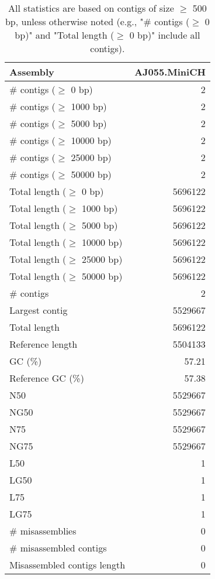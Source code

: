 \documentclass[12pt,a4paper]{article}
\begin{document}
\begin{table}[ht]
\begin{center}
\caption{All statistics are based on contigs of size $\geq$ 500 bp, unless otherwise noted (e.g., "\# contigs ($\geq$ 0 bp)" and "Total length ($\geq$ 0 bp)" include all contigs).}
\begin{tabular}{|l*{1}{|r}|}
\hline
Assembly & AJ055.MiniCH \\ \hline
\# contigs ($\geq$ 0 bp) & 2 \\ \hline
\# contigs ($\geq$ 1000 bp) & 2 \\ \hline
\# contigs ($\geq$ 5000 bp) & 2 \\ \hline
\# contigs ($\geq$ 10000 bp) & 2 \\ \hline
\# contigs ($\geq$ 25000 bp) & 2 \\ \hline
\# contigs ($\geq$ 50000 bp) & 2 \\ \hline
Total length ($\geq$ 0 bp) & 5696122 \\ \hline
Total length ($\geq$ 1000 bp) & 5696122 \\ \hline
Total length ($\geq$ 5000 bp) & 5696122 \\ \hline
Total length ($\geq$ 10000 bp) & 5696122 \\ \hline
Total length ($\geq$ 25000 bp) & 5696122 \\ \hline
Total length ($\geq$ 50000 bp) & 5696122 \\ \hline
\# contigs & 2 \\ \hline
Largest contig & 5529667 \\ \hline
Total length & 5696122 \\ \hline
Reference length & 5504133 \\ \hline
GC (\%) & 57.21 \\ \hline
Reference GC (\%) & 57.38 \\ \hline
N50 & 5529667 \\ \hline
NG50 & 5529667 \\ \hline
N75 & 5529667 \\ \hline
NG75 & 5529667 \\ \hline
L50 & 1 \\ \hline
LG50 & 1 \\ \hline
L75 & 1 \\ \hline
LG75 & 1 \\ \hline
\# misassemblies & 0 \\ \hline
\# misassembled contigs & 0 \\ \hline
Misassembled contigs length & 0 \\ \hline

\end{tabular}
\end{center}
\end{table}
\end{document}

